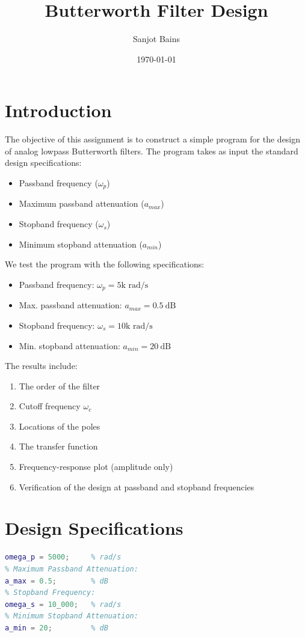 \documentclass[12pt]{article}
\title{Butterworth Filter Design}
\author{Sanjot Bains}
\date{\today}
\begin{document}
\maketitle

\section*{Introduction}
The objective of this assignment is to construct a simple program for the design of analog lowpass Butterworth filters. The program takes as input the standard design specifications:
\begin{itemize}
    \item Passband frequency ($\omega_p$)
    \item Maximum passband attenuation ($a_{max}$)
    \item Stopband frequency ($\omega_s$)
    \item Minimum stopband attenuation ($a_{min}$)
\end{itemize}
We test the program with the following specifications:
\begin{itemize}
    \item Passband frequency: $\omega_p = 5\text{k rad/s}$
    \item Max. passband attenuation: $a_{max} = 0.5\ \text{dB}$
    \item Stopband frequency: $\omega_s = 10\text{k rad/s}$
    \item Min. stopband attenuation: $a_{min} = 20\ \text{dB}$
\end{itemize}
The results include:
\begin{enumerate}
    \item The order of the filter
    \item Cutoff frequency $\omega_c$
    \item Locations of the poles
    \item The transfer function
    \item Frequency-response plot (amplitude only)
    \item Verification of the design at passband and stopband frequencies
\end{enumerate}

\section*{Design Specifications}
\begin{lstlisting}[language=Matlab, caption={Design Specifications}]
% Passband Frequency:
omega_p = 5000;     % rad/s
% Maximum Passband Attenuation:
a_max = 0.5;        % dB
% Stopband Frequency:
omega_s = 10_000;   % rad/s
% Minimum Stopband Attenuation:
a_min = 20;         % dB
\end{lstlisting}
\end{document}
